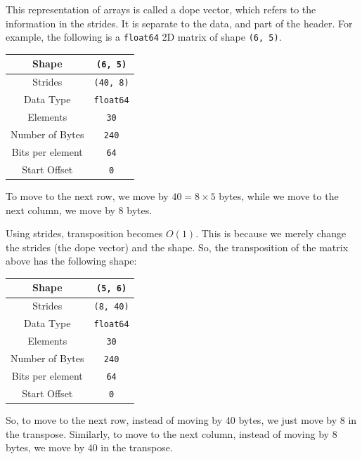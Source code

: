 \documentclass[a4paper, openany]{memoir}
\begin{document}
    This representation of arrays is called a dope vector, which refers to the information in the strides. It is separate to the data, and part of the header. For example, the following is a \texttt{float64} 2D matrix of shape \texttt{(6, 5)}.
    \begin{table}[H]
        \centering
        \begin{tabular}{|c|c|}
            \hline
            Shape & \texttt{(6, 5)} \\
            \hline
            Strides & \texttt{(40, 8)} \\
            \hline
            Data Type & \texttt{float64} \\
            \hline
            Elements & \texttt{30} \\
            \hline
            Number of Bytes & \texttt{240} \\
            \hline
            Bits per element & \texttt{64} \\
            \hline
            Start Offset & \texttt{0} \\
            \hline
        \end{tabular}
    \end{table}
    \noindent To move to the next row, we move by $40 = 8 \times 5$ bytes, while we move to the next column, we move by 8 bytes.

    Using strides, transposition becomes $O(1)$. This is because we merely change the strides (the dope vector) and the shape. So, the transposition of the matrix above has the following shape:
    \begin{table}[H]
        \centering
        \begin{tabular}{|c|c|}
            \hline
            Shape & \texttt{(5, 6)} \\
            \hline
            Strides & \texttt{(8, 40)} \\
            \hline
            Data Type & \texttt{float64} \\
            \hline
            Elements & \texttt{30} \\
            \hline
            Number of Bytes & \texttt{240} \\
            \hline
            Bits per element & \texttt{64} \\
            \hline
            Start Offset & \texttt{0} \\
            \hline
        \end{tabular}
    \end{table}
    \noindent So, to move to the next row, instead of moving by 40 bytes, we just move by 8 in the transpose. Similarly, to move to the next column, instead of moving by 8 bytes, we move by 40 in the transpose.
\end{document}
